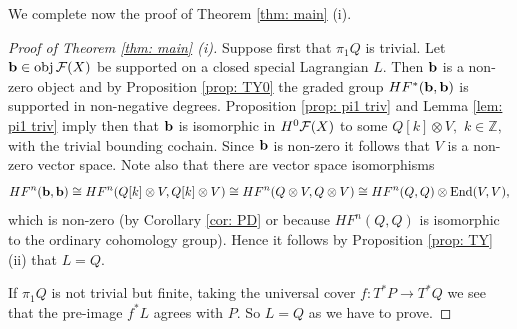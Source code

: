 \documentclass{article}
\theoremstyle{plain}%
\theoremstyle{definition}
\numberwithin{equation}{section}
\numberwithin{figure}{section}
\def\End{\mathop{\rm End}}
\def\cF{{\mathbin{\cal F}}}
\def\Z{{\mathbin{\mathbb Z}}}
\begin{document}
We complete now the proof of Theorem \ref{thm: main} (i).
\begin{proof}[Proof of Theorem {\rm\ref{thm: main} (i)}]
Suppose first that $\pi_1Q$ is trivial. Let $\b\in \obj\cF(X)$ be supported on a closed special Lagrangian $L.$ Then ${\mathbf{b}}$ is a non-zero object and by Proposition \ref{prop: TY0} the graded group $HF^*({\mathbf{b}},{\mathbf{b}})$ is supported in non-negative degrees. Proposition \ref{prop: pi1 triv} and Lemma \ref{lem: pi1 triv} imply then that ${\mathbf{b}}$ is isomorphic in $H^0\cF(X)$ to some $Q[k]\otimes V,$ $k\in\Z,$ with the trivial bounding cochain.
Since ${\mathbf{b}}$ is non-zero it follows that $V$ is a non-zero vector space. 
Note also that there are vector space isomorphisms
\[HF^n(\b,\b)\cong HF^n(Q[k]\otimes V,Q[k]\otimes V)\cong HF^n(Q\otimes V,Q \otimes V)\cong HF^n(Q,Q)\otimes \End(V,V),\]
which is non-zero (by Corollary \ref{cor: PD} or because $HF^n(Q,Q)$ is isomorphic to the ordinary cohomology group). 
Hence it follows by Proposition \ref{prop: TY} (ii) that $L=Q.$

If $\pi_1Q$ is not trivial but finite, taking the universal cover $f:T^*P\to T^*Q$ we see that the pre-image $f^*L$ agrees with $P.$ So $L=Q$ as we have to prove.
\end{proof}
\end{document}

